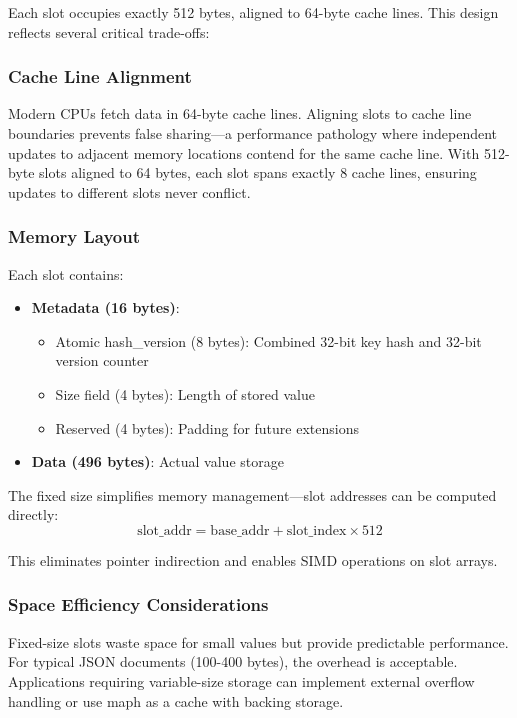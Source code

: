 \documentclass[10pt,conference]{IEEEtran}
\begin{document}
Each slot occupies exactly 512 bytes, aligned to 64-byte cache lines. This design reflects several critical trade-offs:

\subsubsection{Cache Line Alignment}
Modern CPUs fetch data in 64-byte cache lines. Aligning slots to cache line boundaries prevents false sharing—a performance pathology where independent updates to adjacent memory locations contend for the same cache line. With 512-byte slots aligned to 64 bytes, each slot spans exactly 8 cache lines, ensuring updates to different slots never conflict.

\subsubsection{Memory Layout}
Each slot contains:
\begin{itemize}
\item \textbf{Metadata (16 bytes)}:
  \begin{itemize}
  \item Atomic hash\_version (8 bytes): Combined 32-bit key hash and 32-bit version counter
  \item Size field (4 bytes): Length of stored value
  \item Reserved (4 bytes): Padding for future extensions
  \end{itemize}
\item \textbf{Data (496 bytes)}: Actual value storage
\end{itemize}

The fixed size simplifies memory management—slot addresses can be computed directly:
\begin{equation}
\text{slot\_addr} = \text{base\_addr} + \text{slot\_index} \times 512
\end{equation}

This eliminates pointer indirection and enables SIMD operations on slot arrays.

\subsubsection{Space Efficiency Considerations}
Fixed-size slots waste space for small values but provide predictable performance. For typical JSON documents (100-400 bytes), the overhead is acceptable. Applications requiring variable-size storage can implement external overflow handling or use maph as a cache with backing storage.
\end{document}
